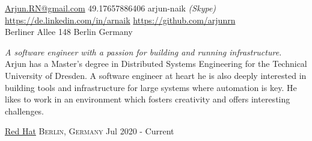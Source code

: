 \documentclass[10pt,a4paper]{article}
\begin{document}
\sloppy  %


\nobreakvspace{0.3em}  %

\noindent\href{mailto:Arjun.RN@gmail.com}{Arjun.RN\mbox{}@\mbox{}gmail.com}\sbull
\textsmaller{+}49.17657886406
\sbull arjun-naik \emph{(Skype)}
\\
\sbull
\href{https://de.linkedin.com/in/arnaik}{https://de.linkedin.com/in/arnaik}
\sbull
\href{https://github.com/arjunrn}{https://github.com/arjunrn}
\\
Berliner Allee 148\sbull
Berlin\sbull
Germany

\spacedhrule{0.9em}{-0.4em}  %


\vspace{-1.3em}  %
\begin{multicols}{2}  %
\noindent \emph{A software engineer with a passion for building and running infrastructure.}
\\
Arjun has a Master's degree in Distributed Systems Engineering for the Technical University of Dresden. A software engineer
    at heart he is also deeply interested in building tools and infrastructure for large systems where automation is key.
    He likes to work in an environment which fosters creativity and offers interesting challenges. 

\end{multicols}

\spacedhrule{0em}{-0.4em}


\headedsection
{\href{https://redhat.com/}{Red Hat}}
{\textsc{Berlin, Germany}}
{
 \headedsubsection
 {}
 {Jul 2020 - Current}
 {
	}
}
\end{document}
